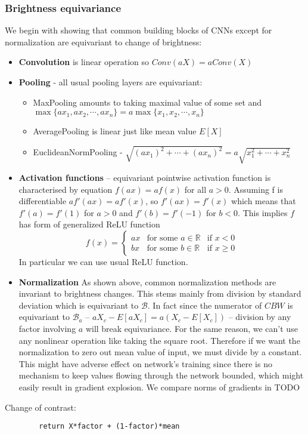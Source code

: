 \subsubsection{Brightness equivariance}
We begin with showing that common building blocks of CNNs except for
normalization are equivariant to change of brightness:
\begin{itemize}
    \item \textbf{Convolution} is linear operation so $\textit{Conv}(aX) =
        a\textit{Conv}(X)$
    \item \textbf{Pooling} - all usual pooling layers are equivariant:
        \begin{itemize}
            \item MaxPooling amounts to taking maximal value of some set and\\
                $\max\{ax_1,ax_2,\cdots,ax_n\}=a\max\{x_1,x_2,\cdots,x_n\}$
            \item AveragePooling is linear just like mean value $E[X]$
            \item EuclideanNormPooling -
                $\sqrt{(ax_1)^2+\cdots+(ax_n)^2} = a\sqrt{x_1^2+\cdots+x_n^2}$
        \end{itemize}
    \item \textbf{Activation functions} -- equivariant pointwise activation
        function is characterised by equation $f(ax) = af(x)$ for all $a>0$.
        Assuming f is differentiable $af'(ax) = af'(x)$, so $f'(ax)=f'(x)$ which
        means that $f'(a)=f'(1)$ for $a>0$ and $f'(b)=f'(-1)$ for $b<0$.
        This implies $f$ has form of generalized ReLU function
        $$f(x)=\left\{
            \begin{array}{lll}
                ax & \mbox{for some } a \in \mathbb{R} & \mbox{if } x<0 \\
                bx & \mbox{for some } b \in \mathbb{R} & \mbox{if } x \geq 0
            \end{array}\right.$$
        In particular we can use usual ReLU function.
    \item \textbf{Normalization} As shown above, common normalization methods are
        invariant to brightness changes. This stems mainly from division by
        standard deviation which is equivariant to $\mathcal{B}$. In fact since
        the numerator of $\mathit{CBW}$ is equivariant to $\mathcal{B}_a$ --
        $aX_c-E[aX_c]=a(X_c-E[X_c])$ -- division by any factor involving $a$
        will break equivariance. For the same reason, we can't use any
        nonlinear operation like taking the square root.
        Therefore if we want the normalization to zero
        out mean value of input, we must divide by a constant. This might have
        adverse effect on network's training since there is no mechanism to keep
        values flowing through the network bounded, which might easily result in
        gradient explosion. We compare norms of gradients in {\color{red}TODO}
\end{itemize}
    Change of contrast:
    \begin{verbatim}
        return X*factor + (1-factor)*mean
    \end{verbatim}

